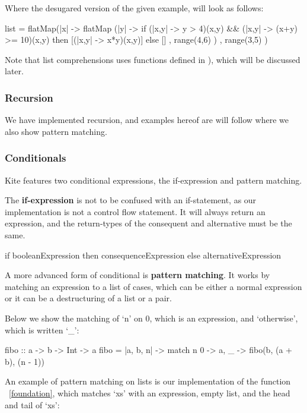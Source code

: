 Where the desugared version of the given example, will look as follows:

\begin{kite}
list =
flatMap(|x| -> {
  flatMap (|y| -> {
    if (|x,y| -> {y > 4})(x,y) && (|x,y| -> {(x+y) >= 10})(x,y)
       then [(|x,y| -> {x*y})(x,y)]
       else []
  } , range(4,6) )
}, range(3,5) )
\end{kite}

Note that list comprehensions uses functions defined in ), which will be discussed later.


\subsubsection{Recursion}
We have implemented recursion, and examples hereof are will follow where we also show pattern matching.


\subsubsection{Conditionals}
Kite features two conditional expressions, the if-expression and pattern matching.

The \textbf{if-expression} is not to be confused with an if-statement, as our implementation is not a control flow statement. It will always return an expression, and the return-types of the consequent and alternative must be the same.

\begin{kite}
if booleanExpression then consequenceExpression else alternativeExpression
\end{kite}

A more advanced form of conditional is \textbf{pattern matching}. It works by matching an expression to a list of cases, which can be either a normal expression or it can be a destructuring of a list or a pair.

Below we show the matching of `n' on 0, which is an expression, and `otherwise', which is written `\_':

\begin{kite}
fibo :: a -> b -> Int -> a
fibo = |a, b, n| -> {
    match n {
    0 -> a,
    _ -> fibo(b, (a + b), (n - 1))
    }
}
\end{kite}

An example of pattern matching on lists is our implementation of the function ~\ref{foundation}, which matches `xs' with an expression, empty list, and the head and tail of `xs':

